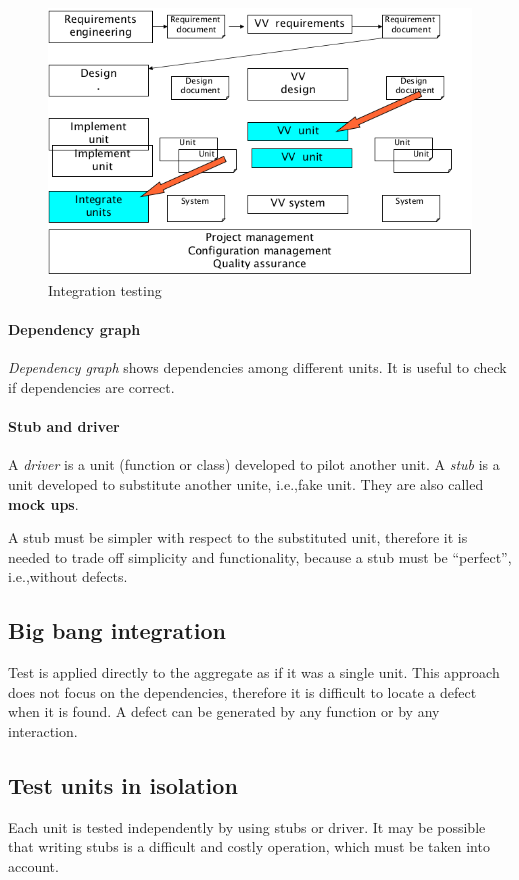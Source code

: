 \begin{figure}[hbtp]
\centering
\includegraphics[scale=0.35]{images/integration_testing.png}
\caption{Integration testing}
\end{figure}

\paragraph{Dependency graph}
\emph{Dependency graph} shows dependencies among different units. It is useful to check if dependencies are correct.

\paragraph{Stub and driver}
A \emph{driver} is a unit (function or class) developed to pilot another unit. A \emph{stub} is a unit developed to substitute another unite, i.e.,\@ fake unit. They are also called \textbf{mock ups}.

A stub must be simpler with respect to the substituted unit, therefore it is needed to trade off simplicity and functionality, because a stub must be ``perfect'', i.e.,\@ without defects.

\subsection*{Big bang integration}
Test is applied directly to the aggregate as if it was a single unit. This approach does not focus on the dependencies, therefore it is difficult to locate a defect when it is found. A defect can be generated by any function or by any interaction.

\subsection*{Test units in isolation}
Each unit is tested independently by using stubs or driver. It may be possible that writing stubs is a difficult and costly operation, which must be taken into account.

